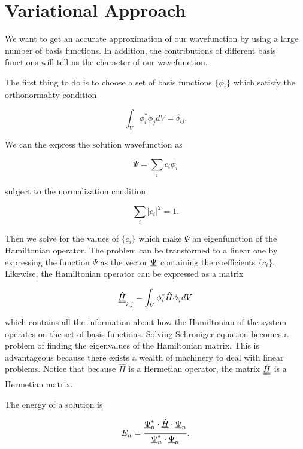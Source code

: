 \documentclass[12pt, a4paper, twocolumn]{article}
\begin{document}
\section{Variational Approach}
\label{sec:var}


We want to get an accurate approximation of our wavefunction by using a large number of basis functions. In addition, the contributions of different basis functions will tell us the character of our wavefunction.

The first thing to do is to choose a set of basis functions $\{ \phi_i \}$ which satisfy the orthonormality condition

\begin{equation}
\int_V \phi_i^*\phi_j dV = \delta_{ij}.
\end{equation}

We can the express the solution wavefunction as 

\begin{equation}
\Psi = \sum_i c_i \phi_i 
\end{equation}

subject to the normalization condition 

\begin{equation}
\sum_i |c_i|^2 = 1.
\end{equation}

Then we solve for the values of $\{ c_i \}$ which make $\Psi$ an eigenfunction of the Hamiltonian operator. The problem can be transformed to a linear one by expressing the function $\Psi$ as the vector $\uline{\Psi}$ containing the coefficients  $\{ c_i \}$. Likewise, the Hamiltonian operator can be expressed as a matrix

\begin{equation}
\uuline{\hat{H}}_{i,j} = \int_V \phi_{i} ^* \hat{H} \phi_{j} dV
\end{equation}

which contains all the information about how the Hamiltonian of the system operates on the set of basis functions. Solving Schroniger equation becomes a problem of finding the eigenvalues of the Hamiltonian matrix. This is advantageous because there exists a wealth of machinery to deal with linear problems. Notice that because $\hat{H}$ is a Hermetian operator, the matrix $\uuline{\hat{H}}$ is a Hermetian matrix.

The energy of a solution is 

\begin{equation}
E_n = \frac{ \uline{\Psi}_n ^* \cdot \uuline{\hat{H}} \cdot \uline{\Psi}_n }{ \uline{\Psi}_n^* \cdot \uline{\Psi}_n }.
\end{equation}
\end{document}

